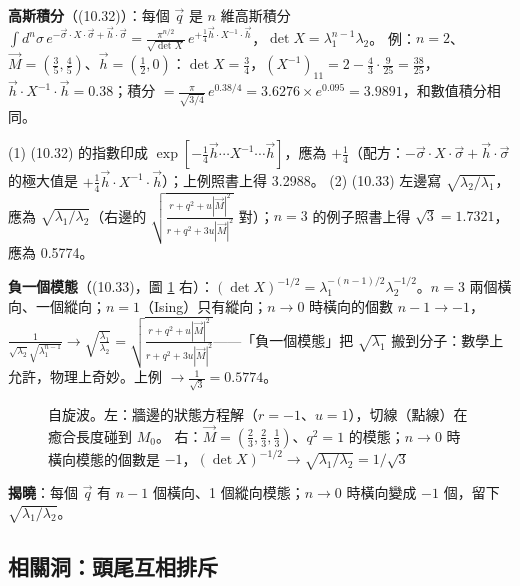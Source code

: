 \textbf{高斯積分}（(10.32)）：每個 $\vec q$ 是 $n$ 維高斯積分 $\int d^n\sigma\,e^{-\vec\sigma\cdot X\cdot\vec\sigma+\vec h\cdot\vec\sigma}=\frac{\pi^{n/2}}{\sqrt{\det X}}\,e^{+\frac14\vec h\cdot X^{-1}\cdot\vec h}$，$\det X=\lambda_1^{n-1}\lambda_2$。
例：$n=2$、$\vec M=(\frac35,\frac45)$、$\vec h=(\frac12,0)$：$\det X=\frac34$，$(X^{-1})_{11}=2-\frac43\cdot\frac9{25}=\frac{38}{25}$，$\vec h\cdot X^{-1}\cdot\vec h=0.38$；積分 $=\frac{\pi}{\sqrt{3/4}}\,e^{0.38/4}=3.6276\times e^{0.095}=3.9891$，和數值積分相同。
\begin{errbox}[p.~242，(10.32)(10.33)]
(1) (10.32) 的指數印成 $\exp[-\frac14\vec h\cdots X^{-1}\cdots\vec h]$，應為 $+\frac14$（配方：$-\vec\sigma\cdot X\cdot\vec\sigma+\vec h\cdot\vec\sigma$ 的極大值是 $+\frac14\vec h\cdot X^{-1}\cdot\vec h$）；上例照書上得 3.2988。
(2) (10.33) 左邊寫 $\sqrt{\lambda_2/\lambda_1}$，應為 $\sqrt{\lambda_1/\lambda_2}$（右邊的 $\sqrt{\frac{r+q^2+u|\vec M|^2}{r+q^2+3u|\vec M|^2}}$ 對）；$n=3$ 的例子照書上得 $\sqrt3=1.7321$，應為 0.5774。
\end{errbox}
\textbf{負一個模態}（(10.33)，圖 \ref{ten-fig-sw} 右）：$(\det X)^{-1/2}=\lambda_1^{-(n-1)/2}\lambda_2^{-1/2}$。$n=3$ 兩個橫向、一個縱向；$n=1$（Ising）只有縱向；$n\to0$ 時橫向的個數 $n-1\to-1$，
$\frac1{\sqrt{\lambda_2}\sqrt{\lambda_1^{n-1}}}\to\sqrt{\frac{\lambda_1}{\lambda_2}}=\sqrt{\frac{r+q^2+u|\vec M|^2}{r+q^2+3u|\vec M|^2}}$——「負一個模態」把 $\sqrt{\lambda_1}$ 搬到分子：數學上允許，物理上奇妙。上例 $\to\frac1{\sqrt3}=0.5774$。

\begin{figure}[htbp]
\centering
\begin{minipage}[c]{0.5\linewidth}\centering\TenFigWall\end{minipage}\hfill
\begin{minipage}[c]{0.48\linewidth}\centering\footnotesize\setlength{\tabcolsep}{3pt}\TenTabModes\end{minipage}
\caption{自旋波。左：牆邊的狀態方程解（$r=-1$、$u=1$），切線（點線）在癒合長度碰到 $M_0$。
右：$\vec M=(\frac23,\frac23,\frac13)$、$q^2=1$ 的模態；$n\to0$ 時橫向模態的個數是 $-1$，$(\det X)^{-1/2}\to\sqrt{\lambda_1/\lambda_2}=1/\sqrt3$}\label{ten-fig-sw}
\end{figure}

\textbf{揭曉}：每個 $\vec q$ 有 $n-1$ 個橫向、1 個縱向模態；$n\to0$ 時橫向變成 $-1$ 個，留下 $\sqrt{\lambda_1/\lambda_2}$。

\subsection{相關洞：頭尾互相排斥}
\leavevmode{}\ \par\nopagebreak

